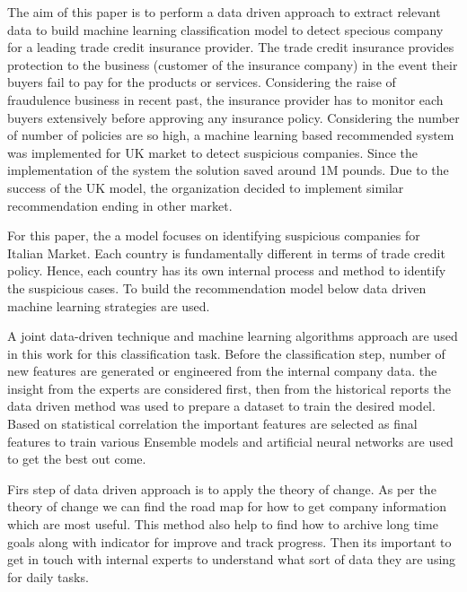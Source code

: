 

The aim of this paper is to perform a data driven approach to extract relevant data to build machine learning classification model to detect specious company for a leading trade credit insurance provider. The trade credit insurance provides protection to the business (customer of the insurance company) in the event their buyers fail to pay for the products or services. Considering the raise of fraudulence business in recent past, the insurance provider has to monitor each buyers extensively before approving any insurance policy. Considering the number of number of policies are so high, a machine learning based recommended system was implemented for UK market to detect suspicious companies. Since the implementation of the system the solution saved around 1M pounds. Due to the success of the UK model, the organization decided to implement similar recommendation ending in other market.

For this paper, the a model focuses on identifying suspicious companies for Italian Market. Each country is fundamentally different in terms of trade credit policy. Hence, each country has its own internal process and method to identify the suspicious cases. To build the recommendation model below data driven machine learning strategies are used.


A joint data-driven technique and machine learning algorithms approach are used in this work for this classification task. Before the classification step, number of new features are generated or engineered from the internal company data. the insight from the experts are considered first, then from the historical reports the data driven method was used to prepare a dataset to train the desired model. Based on statistical correlation the important features are selected as final features to train various Ensemble models and artificial neural networks are used to get the best out come. 

Firs step of data driven approach is to apply the theory of change. As per the theory of change we can find the road map for how to get company information which are most useful. This method also help to find how to archive long time goals along with indicator for improve and track progress. Then its important to get in touch with internal experts to understand what sort of data they are using for daily tasks.

